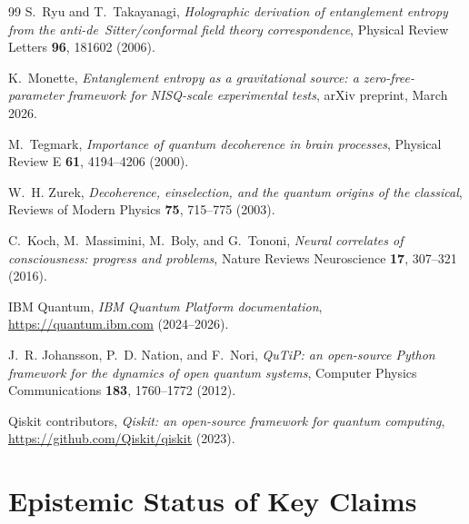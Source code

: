 \documentclass[12pt]{article}
\begin{document}
\begin{thebibliography}{99}
S.~Ryu and T.~Takayanagi,
\textit{Holographic derivation of entanglement entropy from
the anti-de~Sitter/conformal field theory correspondence},
Physical Review Letters \textbf{96}, 181602 (2006).

K.~Monette,
\textit{Entanglement entropy as a gravitational source: a zero-free-parameter
framework for NISQ-scale experimental tests},
arXiv preprint, March 2026.

M.~Tegmark,
\textit{Importance of quantum decoherence in brain processes},
Physical Review E \textbf{61}, 4194--4206 (2000).

W.~H. Zurek,
\textit{Decoherence, einselection, and the quantum origins of the classical},
Reviews of Modern Physics \textbf{75}, 715--775 (2003).

C.~Koch, M.~Massimini, M.~Boly, and G.~Tononi,
\textit{Neural correlates of consciousness: progress and problems},
Nature Reviews Neuroscience \textbf{17}, 307--321 (2016).

IBM Quantum,
\textit{IBM Quantum Platform documentation},
\url{https://quantum.ibm.com} (2024--2026).

J.~R. Johansson, P.~D. Nation, and F.~Nori,
\textit{QuTiP: an open-source Python framework for the dynamics of open
quantum systems},
Computer Physics Communications \textbf{183}, 1760--1772 (2012).

Qiskit contributors,
\textit{Qiskit: an open-source framework for quantum computing},
\url{https://github.com/Qiskit/qiskit} (2023).

\end{thebibliography}

\appendix

\section{Epistemic Status of Key Claims}
\label{app:epistemic}
\end{document}
